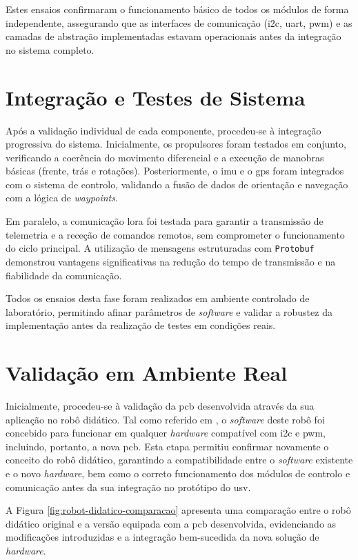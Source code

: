 Estes ensaios confirmaram o funcionamento básico de todos os módulos de forma independente, assegurando que as interfaces de comunicação (\gls{i2c}, \gls{uart}, \gls{pwm}) e as camadas de abstração implementadas estavam operacionais antes da integração no sistema completo.

\section{Integração e Testes de Sistema}

Após a validação individual de cada componente, procedeu-se à integração progressiva do sistema. Inicialmente, os propulsores foram testados em conjunto, verificando a coerência do movimento diferencial e a execução de manobras básicas (frente, trás e rotações). Posteriormente, o \gls{imu} e o \gls{gps} foram integrados com o sistema de controlo, validando a fusão de dados de orientação e navegação com a lógica de \emph{waypoints}.  

Em paralelo, a comunicação \gls{lora} foi testada para garantir a transmissão de telemetria e a receção de comandos remotos, sem comprometer o funcionamento do ciclo principal. A utilização de mensagens estruturadas com \texttt{Protobuf} demonstrou vantagens significativas na redução do tempo de transmissão e na fiabilidade da comunicação.  

Todos os ensaios desta fase foram realizados em ambiente controlado de laboratório, permitindo afinar parâmetros de \emph{software} e validar a robustez da implementação antes da realização de testes em condições reais.  

\section{Validação em Ambiente Real}

Inicialmente, procedeu-se à validação da \gls{pcb} desenvolvida através da sua aplicação no robô didático. Tal como referido em \cite{didactic-robot-thesis}, o \emph{software} deste robô foi concebido para funcionar em qualquer \emph{hardware} compatível com \gls{i2c} e \gls{pwm}, incluindo, portanto, a nova \gls{pcb}. Esta etapa permitiu confirmar novamente o conceito do robô didático, garantindo a compatibilidade entre o \emph{software} existente e o novo \emph{hardware}, bem como o correto funcionamento dos módulos de controlo e comunicação antes da sua integração no protótipo do \gls{usv}.  

A Figura \ref{fig:robot-didatico-comparacao} apresenta uma comparação entre o robô didático original e a versão equipada com a \gls{pcb} desenvolvida, evidenciando as modificações introduzidas e a integração bem-sucedida da nova solução de \emph{hardware}.  

